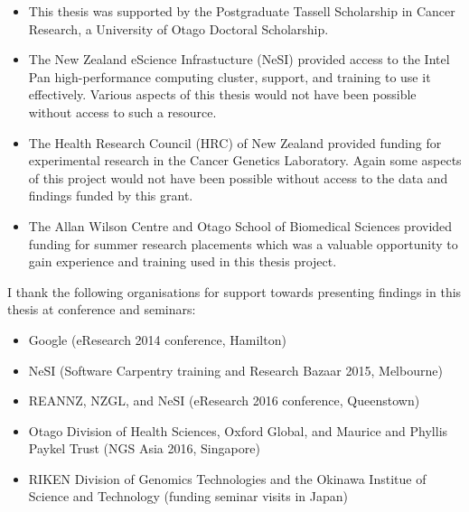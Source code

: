 \begin{small}
 
\begin{itemize}
\item
This thesis was supported by the Postgraduate Tassell Scholarship in Cancer Research, a University of Otago Doctoral Scholarship.

\item
The New Zealand eScience Infrastucture (NeSI) provided access to the Intel Pan high-performance computing cluster, support, and training to use it effectively. Various aspects of this thesis would not have been possible without access to such a resource. 

\item
The Health Research Council (HRC) of New Zealand provided funding for experimental research in the Cancer Genetics Laboratory. Again some aspects of this project would not have been possible without access to the data and findings funded by this grant.

\item
The Allan Wilson Centre and Otago School of Biomedical Sciences provided funding for summer research placements which was a valuable opportunity to gain experience and training used in this thesis project.

\end{itemize}

\end{small}


I thank the following organisations for support towards presenting findings in this thesis at conference and seminars:

\begin{small}

\begin{itemize}

\item
Google (eResearch 2014 conference, Hamilton)

\item
NeSI (Software Carpentry training and Research Bazaar 2015, Melbourne)

\item
REANNZ, NZGL, and NeSI (eResearch 2016 conference, Queenstown)

\item
Otago Division of Health Sciences, Oxford Global, and Maurice and Phyllis Paykel Trust (NGS Asia 2016, Singapore)

\item
RIKEN Division of Genomics Technologies and the Okinawa Institue of Science and Technology (funding seminar visits in Japan)

\end{itemize}

\end{small}

